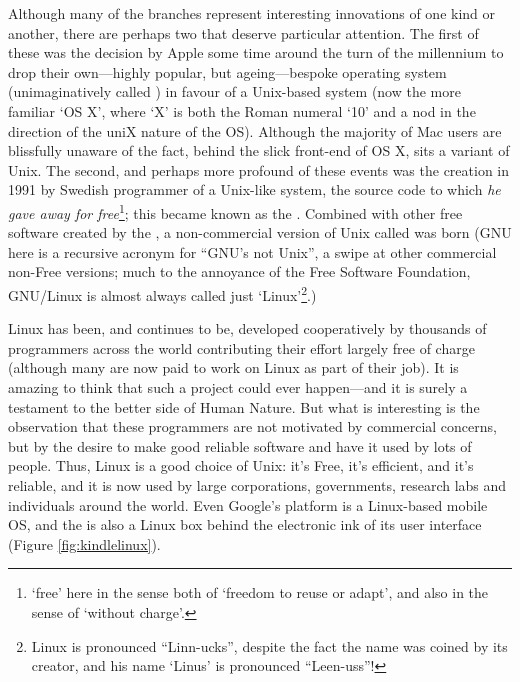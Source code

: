 Although many of the branches represent interesting innovations of one
kind or another, there are perhaps two that deserve particular
attention. The first of these was the decision by Apple some time
around the turn of the millennium to drop their own---highly popular,
but ageing---bespoke operating system (unimaginatively called
) in favour of a Unix-based system (now
the more familiar `OS X', where `X' is both the Roman numeral `10' and
a nod in the direction of the uniX nature of the OS). Although the
majority of Mac users are blissfully unaware of the fact, behind the
slick front-end of OS X, sits a variant of Unix. The second, and
perhaps more profound of these events was the creation in 1991 by
Swedish programmer  of a
Unix-like system, the source code to which \emph{he gave away for
  free}\footnote{`free' here in the sense both of `freedom to reuse or
  adapt', and also in the sense of `without charge'.}; this became
known as the . Combined with
other free software created by the
, a
non-commercial version of Unix called 
was born (GNU here is a recursive acronym for ``GNU's not Unix'', a
swipe at other commercial non-Free versions; much to the annoyance of
the Free Software Foundation, GNU/Linux is almost always called just
`Linux'\footnote{Linux is pronounced ``Linn-ucks'', despite the fact
  the name was coined by its creator, and his name `Linus' is
  pronounced ``Leen-uss''!}.)

Linux has been, and continues to be, developed cooperatively by
thousands of programmers across the world contributing their effort
largely free of charge (although many are now paid to work on Linux as
part of their job). It is amazing to think that such a project could
ever happen---and it is surely a testament to the better side of Human
Nature. But what is interesting is the observation that these
programmers are not motivated by commercial concerns, but by the
desire to make good reliable software and have it used by lots of
people. Thus, Linux is a good choice of Unix: it's Free, it's
efficient, and it's reliable, and it is now used by large
corporations, governments, research labs and individuals around the
world. Even Google's 
platform is a Linux-based mobile OS, and the
 is also a Linux box behind
the electronic ink of its user interface (Figure
\ref{fig:kindlelinux}).

